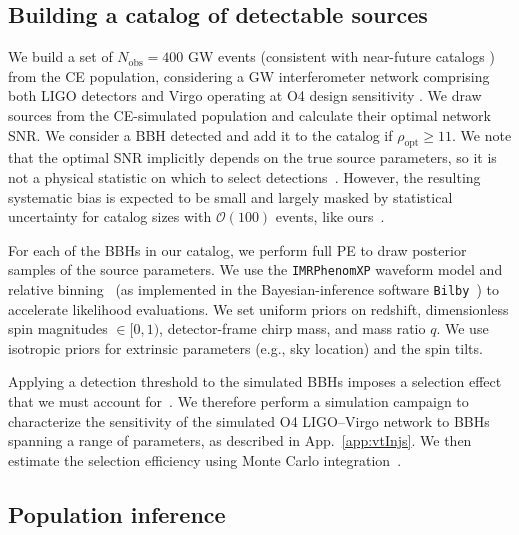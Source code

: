 \documentclass[twocolumn, twocolappendix]{aastex631}
\begin{document}
\subsection{Building a catalog of detectable sources}\label{sec:detectable catalog}

We build a set of ${N_\mathrm{obs} = 400}$ \ac{GW} events (consistent with near-future catalogs \citep{Capote:2024rmo}) from the \ac{CE} population, considering a \ac{GW} interferometer network comprising both LIGO detectors and Virgo operating at O4 design sensitivity \citep{KAGRA:2013rdx, OReilly:2022}. We draw sources from the \ac{CE}-simulated population and calculate their optimal network \ac{SNR}. We consider a \ac{BBH} detected and add it to the catalog if $\rho_{\mathrm{opt}} \geq 11$. We note that the optimal \ac{SNR} implicitly depends on the true source parameters, so it is not a physical statistic on which to select detections~\citep{Essick:2023upv}. However, the resulting systematic bias is expected to be small and largely masked by statistical uncertainty for catalog sizes with $\mathcal{O}(100)$ events, like ours~\citep{Heinzel:2024jlc}.

For each of the \acp{BBH} in our catalog, we perform full \acf{PE} to draw posterior samples of the source parameters. We use the \texttt{IMRPhenomXP} waveform model \citep{Pratten:2020ceb} and relative binning~\citep{Cornish:2010kf, Cornish:2021lje, Zackay:2018qdy,krishna2023:bug} (as implemented in the Bayesian-inference software \texttt{Bilby}~\citep{Ashton:2018jfp}) to accelerate likelihood evaluations. We set uniform priors on redshift, dimensionless spin magnitudes $\in[0,1)$, detector-frame chirp mass, and mass ratio $q$. We use isotropic priors for extrinsic parameters (e.g., sky location) and the spin tilts.

Applying a detection threshold to the simulated \acp{BBH} imposes a selection effect that we must account for~\citep{Thrane:2018qnx, Loredo:2004nn, Mandel:2018mve}. We therefore perform a simulation campaign to characterize the sensitivity of the simulated \ac{O4} LIGO--Virgo network to \acp{BBH} spanning a range of parameters, as described in App.~\ref{app:vtInjs}. We then estimate the selection efficiency using Monte Carlo integration~\citep{Tiwari:2017ndi,Farr_2019}.

\subsection{Population inference}
\label{sec:pop inference}
\end{document}
